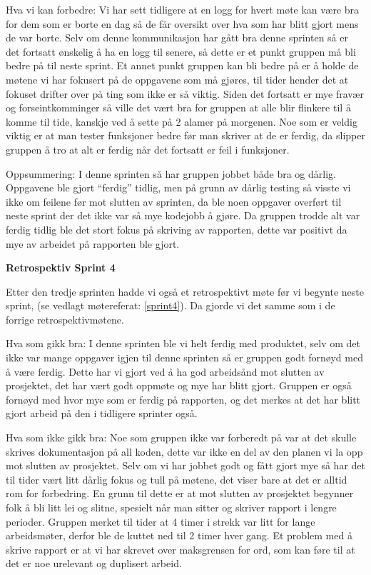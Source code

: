\documentclass[12pt,a4paper,norsk]{article}
\begin{document}
Hva vi kan forbedre:
Vi har sett tidligere at en logg for hvert møte kan være bra for dem som er borte en dag så de får oversikt over hva som har blitt gjort mens de var borte. Selv om denne kommunikasjon har gått bra denne sprinten så er det fortsatt ønskelig å ha en logg til senere, så dette er et punkt gruppen må bli bedre på til neste sprint. 
Et annet punkt gruppen kan bli bedre på er å holde de møtene vi har fokusert på de oppgavene som må gjøres, til tider hender det at fokuset drifter over på ting som ikke er så viktig. Siden det fortsatt er mye fravær og forseintkomminger så ville det vært bra for gruppen at alle blir flinkere til å komme til tide, kanskje ved å sette på 2 alamer på morgenen.   
Noe som er veldig viktig er at man tester funksjoner bedre før man skriver at de er ferdig, da slipper gruppen å tro at alt er ferdig når det fortsatt er feil i funksjoner. 

Oppsummering:
I denne sprinten så har gruppen jobbet både bra og dårlig. Oppgavene ble gjort “ferdig” tidlig, men på grunn av dårlig testing så visste vi ikke om feilene før mot slutten av sprinten, da ble noen oppgaver overført til neste sprint der det ikke var så mye kodejobb å gjøre. Da gruppen trodde alt var ferdig tidlig ble det stort fokus på skriving av rapporten, dette var positivt da mye av arbeidet på rapporten ble gjort.

\bigskip \noindent \textbf{Retrospektiv Sprint 4}
\par Etter den tredje sprinten hadde vi også et retrospektivt møte før vi begynte neste sprint, (se vedlagt møtereferat: \ref{sprint4}). Da gjorde vi det samme som i de forrige retrospektivmøtene. 

Hva som gikk bra:
I denne sprinten ble vi helt ferdig med produktet, selv om det ikke var mange oppgaver igjen til denne sprinten så er gruppen godt fornøyd med å være ferdig. Dette har vi gjort ved å ha god arbeidsånd mot slutten av prosjektet, det har vært godt oppmøte og mye har blitt gjort. 
Gruppen er også fornøyd med hvor mye som er ferdig på rapporten, og det merkes at det har blitt gjort arbeid på den i tidligere sprinter også. 

Hva som ikke gikk bra:
Noe som gruppen ikke var forberedt på var at det skulle skrives dokumentasjon på all koden, dette var ikke en del av den planen vi la opp mot slutten av prosjektet. 
Selv om vi har jobbet godt og fått gjort mye så har det til tider vært litt dårlig fokus og tull på møtene, det viser bare at det er alltid rom for forbedring. En grunn til dette er at mot slutten av prosjektet begynner folk å bli litt lei og slitne, spesielt når man sitter og skriver rapport i lengre perioder. Gruppen merket til tider at 4 timer i strekk var litt for lange arbeidsmøter, derfor ble de kuttet ned til 2 timer hver gang.
Et problem med å skrive rapport er at vi har skrevet over maksgrensen for ord, som kan føre til at det er noe urelevant og duplisert arbeid. 
\end{document}
